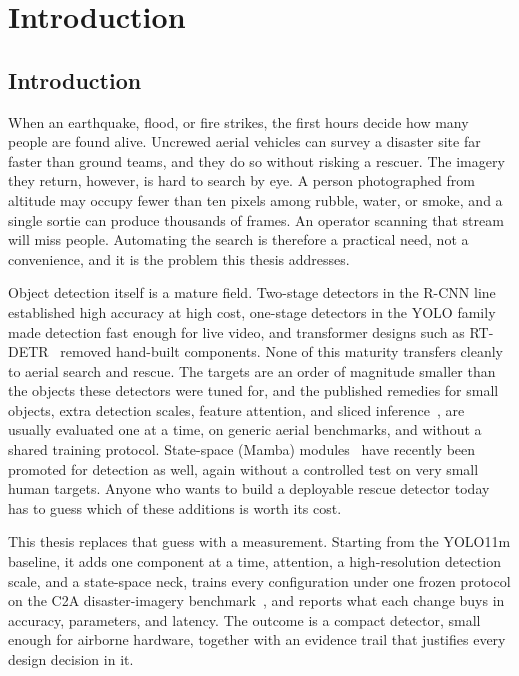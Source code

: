 \chapter{Introduction}

\section{Introduction}
When an earthquake, flood, or fire strikes, the first hours decide how many
people are found alive. Uncrewed aerial vehicles can survey a disaster site far
faster than ground teams, and they do so without risking a rescuer. The imagery
they return, however, is hard to search by eye. A person photographed from
altitude may occupy fewer than ten pixels among rubble, water, or smoke, and a
single sortie can produce thousands of frames. An operator scanning that stream
will miss people. Automating the search is therefore a practical need, not a
convenience, and it is the problem this thesis addresses.

Object detection itself is a mature field. Two-stage detectors in the R-CNN
line~\cite{ren2015fasterrcnn} established high accuracy at high cost, one-stage
detectors in the YOLO family~\cite{redmon2016yolo, jocher2024yolo11} made
detection fast enough for live video, and transformer designs such as
RT-DETR~\cite{zhao2024rtdetr} removed hand-built components. None of this
maturity transfers cleanly to aerial search and rescue. The targets are an
order of magnitude smaller than the objects these detectors were tuned for,
and the published remedies for small objects, extra detection scales, feature
attention, and sliced inference~\cite{akyon2022sahi}, are usually evaluated one
at a time, on generic aerial benchmarks, and without a shared training
protocol. State-space (Mamba) modules~\cite{gu2023mamba} have recently been
promoted for detection as well, again without a controlled test on very small
human targets. Anyone who wants to build a deployable rescue detector today
has to guess which of these additions is worth its cost.

This thesis replaces that guess with a measurement. Starting from the YOLO11m
baseline, it adds one component at a time, attention, a high-resolution
detection scale, and a state-space neck, trains every configuration under one
frozen protocol on the C2A disaster-imagery benchmark~\cite{nihal2024c2a}, and
reports what each change buys in accuracy, parameters, and latency. The outcome
is a compact detector, small enough for airborne hardware, together with an
evidence trail that justifies every design decision in it.

